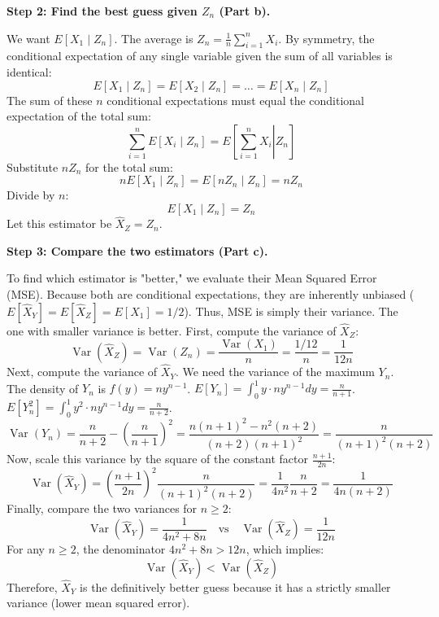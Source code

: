 \begin{solution}
\textbf{Step 2: Find the best guess given $Z_n$ (Part b).}

We want $E[X_1 \mid Z_n]$.
The average is $Z_n = \frac{1}{n} \sum_{i=1}^n X_i$.
By symmetry, the conditional expectation of any single variable given the sum of all variables is identical:
\[ E[X_1 \mid Z_n] = E[X_2 \mid Z_n] = \dots = E[X_n \mid Z_n] \]
The sum of these $n$ conditional expectations must equal the conditional expectation of the total sum:
\[ \sum_{i=1}^n E[X_i \mid Z_n] = E\left[ \left. \sum_{i=1}^n X_i \right| Z_n \right] \]
Substitute $n Z_n$ for the total sum:
\[ n E[X_1 \mid Z_n] = E[n Z_n \mid Z_n] = n Z_n \]
Divide by $n$:
\[ E[X_1 \mid Z_n] = Z_n \]
Let this estimator be $\hat{X}_Z = Z_n$.

\textbf{Step 3: Compare the two estimators (Part c).}

To find which estimator is "better," we evaluate their Mean Squared Error (MSE). Because both are conditional expectations, they are inherently unbiased ($E[\hat{X}_Y] = E[\hat{X}_Z] = E[X_1] = 1/2$). Thus, MSE is simply their variance. The one with smaller variance is better.
First, compute the variance of $\hat{X}_Z$:
\[ \operatorname{Var}(\hat{X}_Z) = \operatorname{Var}(Z_n) = \frac{\operatorname{Var}(X_1)}{n} = \frac{1/12}{n} = \frac{1}{12n} \]
Next, compute the variance of $\hat{X}_Y$. We need the variance of the maximum $Y_n$.
The density of $Y_n$ is $f(y) = n y^{n-1}$.
$E[Y_n] = \int_0^1 y \cdot n y^{n-1} dy = \frac{n}{n+1}$.
$E[Y_n^2] = \int_0^1 y^2 \cdot n y^{n-1} dy = \frac{n}{n+2}$.
\[ \operatorname{Var}(Y_n) = \frac{n}{n+2} - \left(\frac{n}{n+1}\right)^2 = \frac{n(n+1)^2 - n^2(n+2)}{(n+2)(n+1)^2} = \frac{n}{(n+1)^2(n+2)} \]
Now, scale this variance by the square of the constant factor $\frac{n+1}{2n}$:
\[ \operatorname{Var}(\hat{X}_Y) = \left( \frac{n+1}{2n} \right)^2 \frac{n}{(n+1)^2(n+2)} = \frac{1}{4n^2} \frac{n}{n+2} = \frac{1}{4n(n+2)} \]
Finally, compare the two variances for $n \geq 2$:
\[ \operatorname{Var}(\hat{X}_Y) = \frac{1}{4n^2 + 8n} \quad \text{vs} \quad \operatorname{Var}(\hat{X}_Z) = \frac{1}{12n} \]
For any $n \geq 2$, the denominator $4n^2 + 8n > 12n$, which implies:
\[ \operatorname{Var}(\hat{X}_Y) < \operatorname{Var}(\hat{X}_Z) \]
Therefore, $\hat{X}_Y$ is the definitively better guess because it has a strictly smaller variance (lower mean squared error).
\end{solution}

